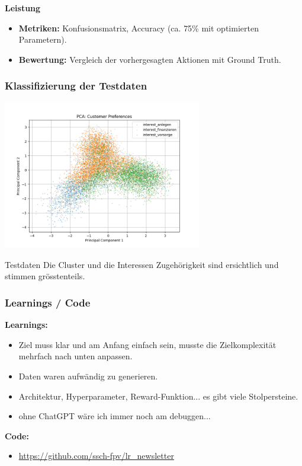 \documentclass{beamer}
\begin{document}
\begin{frame}
\vspace{0.1cm} %

\begin{block}{}
\textbf{Leistung}
    \begin{itemize}
        \item \textbf{Metriken:} Konfusionsmatrix, Accuracy (ca. 75\% mit optimierten Parametern).
        \item \textbf{Bewertung:} Vergleich der vorhergesagten Aktionen mit Ground Truth.
    \end{itemize}
\end{block}

\end{frame}




\begin{frame}
\label{sec8}
 \frametitle{Klassifizierung der Testdaten}
 \centering
  \includegraphics[width=0.65\textwidth]{figures/pca_test_data_action_small.png}
  
    \begin{block}{Testdaten}
  Die Cluster und die Interessen Zugehörigkeit sind ersichtlich und stimmen grösstenteils.
  \end{block}
   
  
\end{frame}


\begin{frame}  
	\label{sec9}
  	\frametitle{Learnings / Code}
  	\textbf{Learnings:}
  	\begin{itemize}
	\item Ziel muss klar und am Anfang einfach sein, musste die Zielkomplexität mehrfach nach unten anpassen.
	\item Daten waren aufwändig zu generieren.
	\item Architektur, Hyperparameter, Reward-Funktion... es gibt viele Stolpersteine.
	\item ohne ChatGPT wäre ich immer noch am debuggen...
	\end{itemize}
	
	\textbf{Code:}
	\begin{itemize}

	\item \url{https://github.com/ssch-fpv/lr_newsletter}
	\end{itemize}

 \end{frame}
\end{document}
